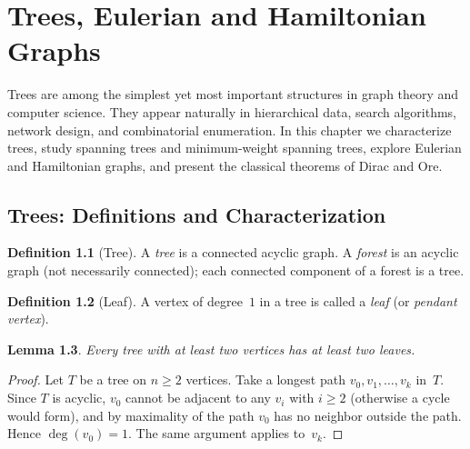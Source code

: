 \documentclass[12pt,a4paper,openany]{book}
\theoremstyle{definition}
\newtheorem{definition}{Definition}[chapter]
\theoremstyle{plain}
\newtheorem{lemma}[definition]{Lemma}
\theoremstyle{remark}
\begin{document}
\chapter{Trees, Eulerian and Hamiltonian Graphs}
\label{ch:trees-euler-hamilton}

Trees are among the simplest yet most important structures in graph
theory and computer science.  They appear naturally in hierarchical
data, search algorithms, network design, and combinatorial enumeration.
In this chapter we characterize trees, study spanning trees and
minimum-weight spanning trees, explore Eulerian and Hamiltonian
graphs, and present the classical theorems of Dirac and Ore.

\section{Trees: Definitions and Characterization}
\label{sec:tree-def}

\begin{definition}[Tree]
\label{def:tree}
A \emph{tree} is a connected acyclic graph.  A \emph{forest} is an
acyclic graph (not necessarily connected); each connected component
of a forest is a tree.
\end{definition}

\begin{definition}[Leaf]
\label{def:leaf}
A vertex of degree~$1$ in a tree is called a \emph{leaf}
(or \emph{pendant vertex}).
\end{definition}

\begin{lemma}
\label{lem:tree-leaf}
Every tree with at least two vertices has at least two leaves.
\end{lemma}

\begin{proof}
Let $T$ be a tree on $n\ge 2$ vertices.  Take a longest path
$v_0,v_1,\dots,v_k$ in~$T$.  Since $T$ is acyclic, $v_0$ cannot be
adjacent to any $v_i$ with $i\ge 2$ (otherwise a cycle would form),
and by maximality of the path $v_0$ has no neighbor outside the path.
Hence $\deg(v_0)=1$.  The same argument applies to~$v_k$.
\end{proof}
\end{document}
